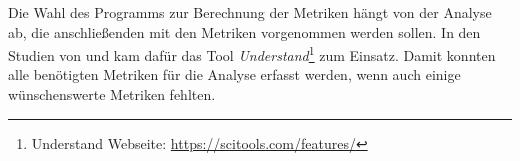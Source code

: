 Die Wahl des Programms zur Berechnung der Metriken hängt von der Analyse ab, die anschließenden mit den Metriken vorgenommen werden sollen.
In den Studien von \cite{alves_et_al} und \cite{chowdhury_zulkernine_2009} kam dafür das Tool \emph{Understand}\footnote{Understand Webseite: \url{https://scitools.com/features/}} zum Einsatz.
Damit konnten alle benötigten Metriken für die Analyse erfasst werden, wenn auch einige wünschenswerte Metriken fehlten.
